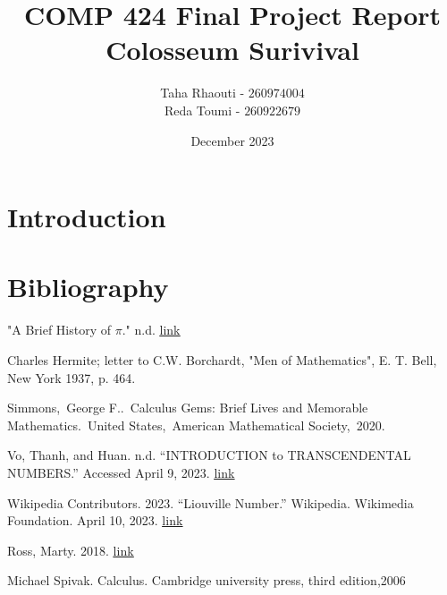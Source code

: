 \documentclass[12pt]{article}
\title{COMP 424 Final Project Report \\ Colosseum Surivival}
\author{Taha Rhaouti - $260974004$ \\ Reda Toumi - $260922679$}
\date{December 2023}
\begin{document}
\maketitle

\section{Introduction}

\pagebreak
\section*{Bibliography}

\begin{flushleft}
    "A Brief History of $\pi$." n.d. \href{https://www.exploratorium.edu/sites/default/files/pdfs/history_of_pi.pdf}{\underline{link}}
\end{flushleft}

\begin{flushleft}
    Charles Hermite; letter to C.W. Borchardt, "Men of Mathematics", E. T. Bell, New York 1937, p. 464.
\end{flushleft}

\begin{flushleft}
    Simmons, George F.. Calculus Gems: Brief Lives and Memorable Mathematics. United States, American Mathematical Society, 2020.
\end{flushleft}

\begin{flushleft}
    Vo, Thanh, and Huan. n.d. “INTRODUCTION to TRANSCENDENTAL NUMBERS.” Accessed April 9, 2023. \href{http://www.math.toronto.edu/vohuan/Notes/mas216_report.pdf}{\underline{link}}
\end{flushleft}

\begin{flushleft}
    Wikipedia Contributors. 2023. “Liouville Number.” Wikipedia. Wikimedia Foundation. April 10, 2023. \href{https://en.wikipedia.org/wiki/Liouville_number#:~:text=Liouville%20numbers%20are%20%22almost%20rational,algebraic%20irrational%20number%20can%20be}{\underline{link}}
\end{flushleft}

\begin{flushleft}
    Ross, Marty. 2018. \href{https://www.qedcat.com/notes/e%20%2B%20pi%20transcendental.pdf}{\underline{link}}
\end{flushleft}

\begin{flushleft}
    Michael Spivak. Calculus. Cambridge university press, third edition,2006
\end{flushleft}
\end{document}
